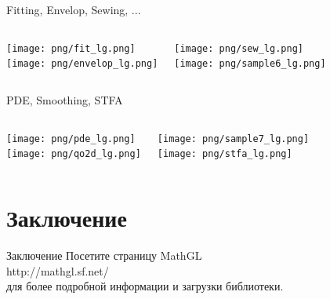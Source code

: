 \documentclass[color=usenames]{beamer}
\begin{document}
\begin{frame}{Fitting, Envelop, Sewing, ...}
\begin{columns}
\texttt{[image: png/fit\_lg.png]}\\
\texttt{[image: png/envelop\_lg.png]}

\texttt{[image: png/sew\_lg.png]}\\
\texttt{[image: png/sample6\_lg.png]}

\end{columns}
\end{frame}

\begin{frame}{PDE, Smoothing, STFA}
\begin{columns}
\texttt{[image: png/pde\_lg.png]}\\
\texttt{[image: png/qo2d\_lg.png]}

\texttt{[image: png/sample7\_lg.png]}\\
\texttt{[image: png/stfa\_lg.png]}

\end{columns}
\end{frame}

\section{Заключение}
\begin{frame}{Заключение}
\LARGE
Посетите страницу MathGL\\[18pt]

http://mathgl.sf.net/\\[18pt]

для более подробной информации и загрузки библиотеки.
\end{frame}
\end{document}
